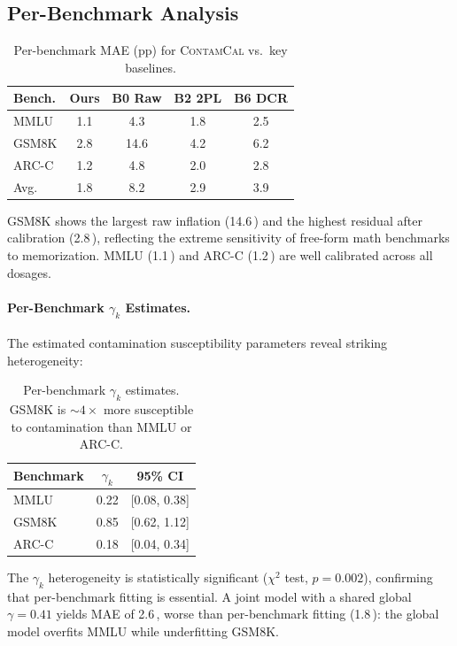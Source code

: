\documentclass[11pt,a4paper]{article}
\newcommand{\contamcal}{\textsc{ContamCal}}
\newcommand{\pp}{\,\text{pp}}
\begin{document}
\subsection{Per-Benchmark Analysis}

\begin{table}[t]
\centering
\small
\caption{Per-benchmark MAE (pp) for \contamcal{} vs.\ key baselines.}
\label{tab:per_bench}
\begin{tabular}{lcccc}
\toprule
\textbf{Bench.} & \textbf{Ours} & \textbf{B0 Raw} & \textbf{B2 2PL} & \textbf{B6 DCR} \\
\midrule
MMLU  & 1.1 & 4.3  & 1.8 & 2.5 \\
GSM8K & 2.8 & 14.6 & 4.2 & 6.2 \\
ARC-C & 1.2 & 4.8  & 2.0 & 2.8 \\
\midrule
Avg.  & 1.8 & 8.2  & 2.9 & 3.9 \\
\bottomrule
\end{tabular}
\end{table}

GSM8K shows the largest raw inflation (14.6\pp{}) and the highest residual after calibration (2.8\pp{}), reflecting the extreme sensitivity of free-form math benchmarks to memorization.
MMLU (1.1\pp{}) and ARC-C (1.2\pp{}) are well calibrated across all dosages.

\paragraph{Per-Benchmark $\gamma_k$ Estimates.}
The estimated contamination susceptibility parameters reveal striking heterogeneity:

\begin{table}[t]
\centering
\small
\caption{Per-benchmark $\gamma_k$ estimates. GSM8K is ${\sim}4\times$ more susceptible to contamination than MMLU or ARC-C.}
\label{tab:gamma}
\begin{tabular}{lcc}
\toprule
\textbf{Benchmark} & $\gamma_k$ & \textbf{95\% CI} \\
\midrule
MMLU  & 0.22 & [0.08, 0.38] \\
GSM8K & 0.85 & [0.62, 1.12] \\
ARC-C & 0.18 & [0.04, 0.34] \\
\bottomrule
\end{tabular}
\end{table}

The $\gamma_k$ heterogeneity is statistically significant ($\chi^2$ test, $p = 0.002$), confirming that per-benchmark fitting is essential.
A joint model with a shared global $\gamma = 0.41$ yields MAE of 2.6\pp{}, worse than per-benchmark fitting (1.8\pp{}): the global model overfits MMLU while underfitting GSM8K.
\end{document}
